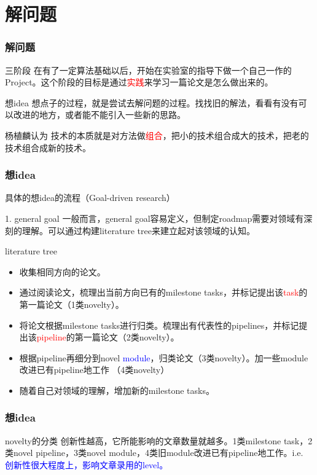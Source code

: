 \documentclass{beamer}
\begin{document}
\section{解问题}
\begin{frame}
    \frametitle{解问题}
    \begin{block}{三阶段}
        在有了一定算法基础以后，开始在实验室的指导下做一个自己一作的Project。这个阶段的目标是通过\textcolor{red}{实践}来学习一篇论文是怎么做出来的。
    \end{block}
    \begin{exampleblock}{想idea}
        想点子的过程，就是尝试去解问题的过程。找找旧的解法，看看有没有可以改进的地方，或者能不能引入一些新的思路。
    \end{exampleblock}
    \begin{block}{杨植麟认为}
        技术的本质就是对方法做\textcolor{red}{组合}，把小的技术组合成大的技术，把老的技术组合成新的技术。
    \end{block}
\end{frame}

\begin{frame}
    \frametitle{想idea}
    具体的想idea的流程（Goal-driven research）
    \begin{block}{1. general goal}
        一般而言，general goal容易定义，但制定roadmap需要对领域有深刻的理解。可以通过构建literature tree来建立起对该领域的认知。
    \end{block}
    \begin{block}{literature tree}
        \begin{itemize}
            \item 收集相同方向的论文。
            \item 通过阅读论文，梳理出当前方向已有的milestone tasks，并标记提出该\textcolor{red}{task}的第一篇论文（1类novelty）。
            \item 将论文根据milestone tasks进行归类。梳理出有代表性的pipelines，并标记提出该\textcolor{red}{pipeline}的第一篇论文（2类novelty）。
            \item 根据pipeline再细分到novel \textcolor{blue}{module}，归类论文（3类novelty）。加一些module改进已有pipeline地工作 （4类novelty）
            \item 随着自己对领域的理解，增加新的milestone tasks。
        \end{itemize}
    \end{block}
\end{frame}

\begin{frame}
    \frametitle{想idea}
    \begin{exampleblock}{novelty的分类}
        创新性越高，它所能影响的文章数量就越多。1类milestone task，2类novel pipeline，3类novel module，4类旧module改进已有pipeline地工作。i.e. \textcolor{blue}{创新性很大程度上，影响文章录用的level。}
    \end{exampleblock}

    
\end{frame}
\end{document}
